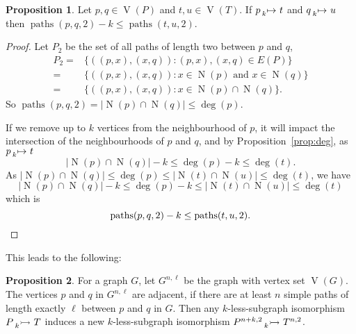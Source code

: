 \documentclass[letterpaper]{article}
\theoremstyle{definition}
\newtheorem{proposition}{Proposition}
\newcommand{\paths}{\operatorname{paths}}
\newcommand{\lessnonind}[1]{\prescript{}{#1}{\rightarrowtail}\ }
\newcommand{\lessmap}[1]{\prescript{}{#1}{\mapsto}\ }
\newcommand{\V}{\operatorname{V}}
\newcommand{\N}{\operatorname{N}}
\begin{document}
\begin{proposition}
    Let $p,q \in \V(P)$ and $t,u\in \V(T)$. If $p \lessmap{k} t$ and $q \lessmap{k} u$ then
     $\paths(p, q, 2) - k \le \paths(t, u, 2)$.
\end{proposition}
\begin{proof}
Let $P_{2}$ be the set of all paths of length two between $p$ and $q$,
\begin{align*}
P_{2} = & \{((p,x),(x,q)) : (p,x),(x,q)\in E(P) \} \\
 = & \{((p,x),(x,q)) : x\in \N(p) \text{ and } x\in \N(q) \} \\
 = & \{((p,x),(x,q)) : x\in \N(p)\cap \N(q) \} .
\end{align*}
So $\paths(p,q,2) = \left| \N(p)\cap \N(q) \right|  \leq \deg(p)$.

If we remove up to $k$ vertices from the neighbourhood of $p$, it will impact the intersection of the neighbourhoods of $p$ and $q$, and by Proposition~\ref{prop:deg}, as $p\lessmap{k}t$
\[
\left| \N(p)\cap \N(q)\right| - k \leq \deg(p) - k \leq \deg(t).
\]
As $\left|\N(p)\cap \N(q)\right|\leq \deg(p) \leq \left|\N(t)\cap \N(u)\right|\leq \deg(t)$, we have
\[
\left|\N(p)\cap \N(q)\right| - k \leq \deg(p) - k\leq \left|\N(t)\cap \N(u)\right|\leq \deg(t)
\]
which is
\[
\paths(p, q, 2) - k \leq \paths(t, u, 2). \qedhere
\]
\end{proof}

This leads to the following:

\begin{proposition}
    For a graph $G$, let $G^{n, \ell}$ be the graph with vertex set $\V(G)$. The
    vertices $p$ and $q$ in $G^{n, \ell}$ are adjacent, if there are at least $n$ simple paths of
    length exactly $\ell$ between $p$ and $q$ in $G$. Then any $k$-less-subgraph isomorphism
    $P \lessnonind{k} T$ induces a new $k$-less-subgraph isomorphism
    $P^{n+k, 2}\lessnonind{k} T^{n, 2}$.
\end{proposition}
\end{document}
